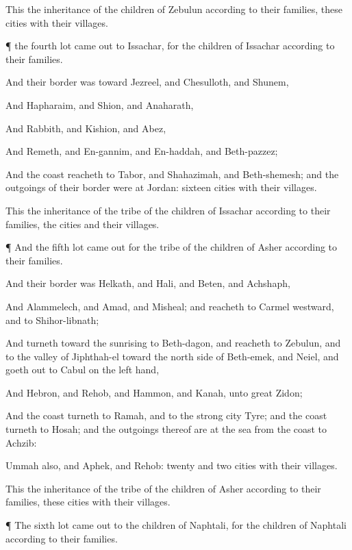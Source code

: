 {This
{} the
inheritance of the
children of
Zebulun according to their
families, these
cities with their
villages.


\par }{\PP {}¶
{} the
fourth
lot came
out to
Issachar, for the
children of
Issachar according to their
families.

And their
border was toward
Jezreel, and
Chesulloth, and
Shunem,

And
Hapharaim, and
Shion, and
Anaharath,

And
Rabbith, and
Kishion, and
Abez,

And
Remeth, and
En-gannim, and
En-haddah, and
Beth-pazzez;

And the
coast
reacheth to
Tabor, and
Shahazimah, and
Beth-shemesh; and the
outgoings of their
border were at
Jordan:
sixteen
cities with their
villages.

This
{} the
inheritance of the
tribe of the
children of
Issachar according to their
families, the
cities and their
villages.


\par }{\PP {}¶ And the
fifth
lot came
out for the
tribe of the
children of
Asher according to their
families.

And their
border was
Helkath, and
Hali, and
Beten, and
Achshaph,

And
Alammelech, and
Amad, and
Misheal; and
reacheth to
Carmel
westward, and to
Shihor-libnath;

And
turneth toward the
sunrising to
Beth-dagon, and
reacheth to
Zebulun, and to the
valley of
Jiphthah-el toward the north
side of
Beth-emek, and
Neiel, and goeth
out to
Cabul on the left
hand,

And
Hebron, and
Rehob, and
Hammon, and
Kanah,
{} unto
great
Zidon;

And
{} the
coast
turneth to
Ramah, and to the
strong
city
Tyre; and the
coast
turneth to
Hosah; and the
outgoings thereof are at the
sea from the
coast to
Achzib:

Ummah also, and
Aphek, and
Rehob:
twenty and
two
cities with their
villages.

This
{} the
inheritance of the
tribe of the
children of
Asher according to their
families, these
cities with their
villages.


\par }{\PP {}¶ The
sixth
lot came
out to the
children of
Naphtali,
{} for the
children of
Naphtali according to their
families.

}
